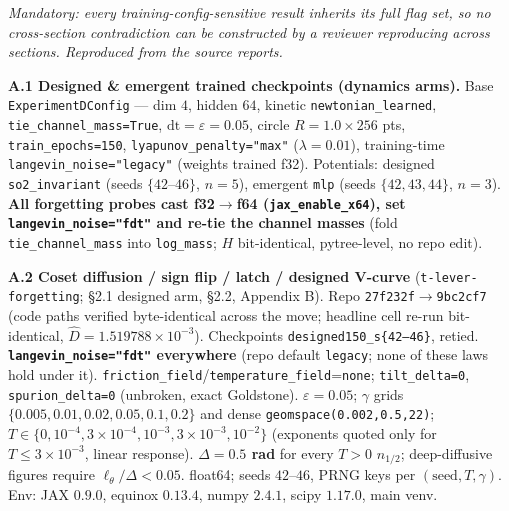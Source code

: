 \documentclass{article}
\begin{document}
\emph{Mandatory: every training-config-sensitive result inherits its full flag set, so no cross-section contradiction can be constructed by a reviewer reproducing across sections. Reproduced from the source reports.}

\textbf{A.1 Designed \& emergent trained checkpoints (dynamics arms).} Base \texttt{ExperimentDConfig} --- dim $4$, hidden $64$, kinetic \texttt{newtonian\_learned}, \texttt{tie\_channel\_mass=True}, $\mathrm{dt}=\varepsilon=0.05$, circle $R=1.0\times256$ pts, \texttt{train\_epochs=150}, \texttt{lyapunov\_penalty="max"} ($\lambda=0.01$), training-time \texttt{langevin\_noise="legacy"} (weights trained f32). Potentials: designed \texttt{so2\_invariant} (seeds $\{42$--$46\}$, $n=5$), emergent \texttt{mlp} (seeds $\{42,43,44\}$, $n=3$). \textbf{All forgetting probes cast f32$\to$f64 (\texttt{jax\_enable\_x64}), set \texttt{langevin\_noise="fdt"} and re-tie the channel masses} (fold \texttt{tie\_channel\_mass} into \texttt{log\_mass}; $H$ bit-identical, pytree-level, no repo edit).

\textbf{A.2 Coset diffusion / sign flip / latch / designed V-curve} (\texttt{t-lever-forgetting}; \S 2.1 designed arm, \S 2.2, Appendix B). Repo \texttt{27f232f}$\to$\texttt{9bc2cf7} (code paths verified byte-identical across the move; headline cell re-run bit-identical, $\hat D=1.519788\times10^{-3}$). Checkpoints \texttt{designed150\_s\{42--46\}}, retied. \textbf{\texttt{langevin\_noise="fdt"} everywhere} (repo default \texttt{legacy}; none of these laws hold under it). \texttt{friction\_field}/\texttt{temperature\_field}=\texttt{none}; \texttt{tilt\_delta=0}, \texttt{spurion\_delta=0} (unbroken, exact Goldstone). $\varepsilon=0.05$; $\gamma$ grids $\{0.005,0.01,0.02,0.05,0.1,0.2\}$ and dense \texttt{geomspace(0.002,0.5,22)}; $T\in\{0,10^{-4},3\times10^{-4},10^{-3},3\times10^{-3},10^{-2}\}$ (exponents quoted only for $T\le3\times10^{-3}$, linear response). \textbf{$\Delta=0.5$ rad} for every $T>0$ $n_{1/2}$; deep-diffusive figures require $\ell_\theta/\Delta<0.05$. float64; seeds $42$--$46$, PRNG keys per $(\text{seed},T,\gamma)$. Env: JAX $0.9.0$, equinox $0.13.4$, numpy $2.4.1$, scipy $1.17.0$, main venv.
\end{document}
